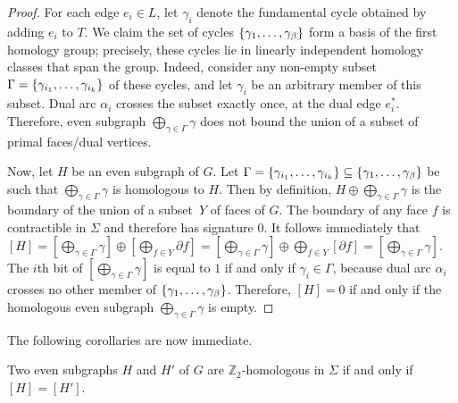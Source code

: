 \documentclass[letterpaper,review]{siamart190516}
\def\Z{\mathbb{Z}}
\def\cycle{\gamma}
\def\dualarc{\alpha}
\def\rnote#1{\color{red}Review: #1 \color{black}}
\def\knote#1{\textcolor{olive}{Kyle: #1}}
\begin{document}
\begin{proof}



For each edge \(e_i \in L\), let \(\cycle_i\) denote the fundamental cycle obtained by adding
\(e_i\) to \(T\).
We claim the set of cycles \(\Set{\cycle_1, \dots, \cycle_\beta}\) form a basis of the first
homology group;
precisely, these cycles lie in linearly independent homology classes that span the group.
Indeed, consider any non-empty subset \(\Gamma = \Set{\cycle_{i_1}, \dots, \cycle_{i_k}}\) of these
cycles, and let \(\cycle_i\) be an arbitrary member of this subset.
Dual arc \(\alpha_i\) crosses the subset exactly once, at the dual edge \(e^*_i\).
Therefore, even subgraph \(\bigoplus_{\cycle \in \Gamma} \cycle\) does not bound the union of a
subset of primal faces/dual vertices.

Now, let $H$ be an even subgraph of $G$.
Let \(\Gamma = \Set{\cycle_{i_1}, \dots, \cycle_{i_k}} \subseteq \Set{\cycle_1, \dots,
\cycle_\beta}\) be such that \(\bigoplus_{\cycle \in \Gamma} \cycle\) is homologous to \(H\).
Then by definition, $H \oplus \bigoplus_{\cycle \in \Gamma} \cycle$ is the boundary of the union of
a subset~$Y$ of faces of $G$.
The boundary of any face $f$ is contractible in $\Sigma$ and therefore has signature $0$.
It follows immediately that $[H] = [\bigoplus_{\cycle \in \Gamma} \cycle] \oplus [\bigoplus_{f\in Y}
\partial f] = [\bigoplus_{\cycle \in \Gamma} \cycle] \oplus \bigoplus_{f\in Y} [\partial f] =
[\bigoplus_{\cycle \in \Gamma} \cycle]$.
The \(i\)th bit of \([\bigoplus_{\cycle \in \Gamma} \cycle]\) is equal to \(1\) if and only if
\(\gamma_i \in \Gamma\), because dual arc \(\dualarc_i\) crosses no other member of \(\Set{\cycle_1,
\dots, \cycle_\beta}\).
Therefore, \([H] = 0\) if and only if the homologous even subgraph \(\bigoplus_{\cycle \in \Gamma}
\cycle\) is empty.
\end{proof}

The following corollaries are now immediate.

\begin{corollary}
Two even subgraphs $H$ and $H'$ of $G$ are $\Z_2$-homologous in $\Sigma$ if and only if $[H] = [H']$.
\end{corollary}
\end{document}
